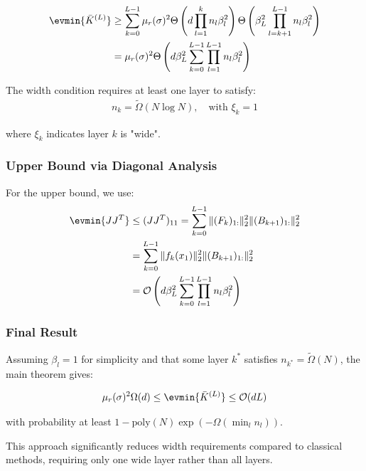 \documentclass[a4paper]{article}
\begin{document}
\begin{align}
\evmin{\bar{K}^{(L)}} &\geq \sum_{k=0}^{L-1} \mu_r(\sigma)^2 \Theta\left(d \prod_{l=1}^k n_l \beta_l^2\right) \Theta\left(\beta_L^2 \prod_{l=k+1}^{L-1} n_l \beta_l^2\right) \\
&= \mu_r(\sigma)^2 \Theta\left(d \beta_L^2 \sum_{k=0}^{L-1} \prod_{l=1}^{L-1} n_l \beta_l^2\right)
\end{align}

The width condition requires at least one layer to satisfy:
\begin{align}
n_k = \tilde{\Omega}(N \log N), \quad \text{with } \xi_k = 1
\end{align}

where $\xi_k$ indicates layer $k$ is "wide".

\subsubsection{Upper Bound via Diagonal Analysis}

For the upper bound, we use:
\begin{align}
\evmin{JJ^T} &\leq (JJ^T)_{11} = \sum_{k=0}^{L-1} \|(F_k)_{1:}\|_2^2 \|(B_{k+1})_{1:}\|_2^2 \\
&= \sum_{k=0}^{L-1} \|f_k(x_1)\|_2^2 \|(B_{k+1})_{1:}\|_2^2 \\
&= \mathcal{O}\left(d \beta_L^2 \sum_{k=0}^{L-1} \prod_{l=1}^{L-1} n_l \beta_l^2\right)
\end{align}

\subsubsection{Final Result}

Assuming $\beta_l = 1$ for simplicity and that some layer $k^*$ satisfies $n_{k^*} = \tilde{\Omega}(N)$, the main theorem gives:

\begin{align}
\mu_r(\sigma)^2 \Omega(d) \leq \evmin{\bar{K}^{(L)}} \leq \mathcal{O}(d L)
\end{align}

with probability at least $1 - \text{poly}(N) \exp(-\Omega(\min_l n_l))$.

This approach significantly reduces width requirements compared to classical methods, requiring only one wide layer rather than all layers.
\end{document}
